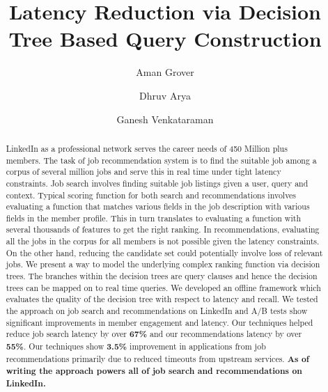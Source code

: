 \documentclass[sigconf]{acmart}
\begin{document}
\title{Latency Reduction via Decision Tree Based Query Construction}

\author{Aman Grover}


\author{Dhruv Arya}


\author{Ganesh Venkataraman}


\begin{abstract}
LinkedIn as a professional network serves the career needs of 450 Million plus members. 
The task of job recommendation system is to find the suitable job among a corpus of several million jobs and serve this in real time under tight latency constraints. 
Job search involves finding suitable job listings given a user, query and
context.  Typical scoring function for both search and recommendations 
involves evaluating a function that matches various fields in the job description 
with various fields in the member profile.
This in turn translates to evaluating a function with several thousands of features to get the right ranking. 
In recommendations, evaluating all the jobs in the corpus for all members is not possible given the latency constraints. 
On the other hand, reducing the candidate set could 
potentially involve loss of relevant jobs. 
We present a way to model the underlying complex ranking function via decision
trees. The branches within the decision trees are query clauses and hence the
decision trees can be mapped on to real time queries. 
We developed an offline framework which
evaluates the quality of the decision tree with respect to latency and recall.
We tested the approach on job search and recommendations on LinkedIn and A/B tests show significant improvements in member engagement and latency. 
Our techniques helped reduce job search latency by over {\bf 67\%} and our
recommendations latency by over {\bf 55\%}. Our techniques
show {\bf 3.5\%} improvement in applications from job recommendations
primarily due to reduced timeouts from upstream services.
{\bf As of writing the approach powers all of job search and recommendations on LinkedIn.} 
\end{abstract}
\end{document}
